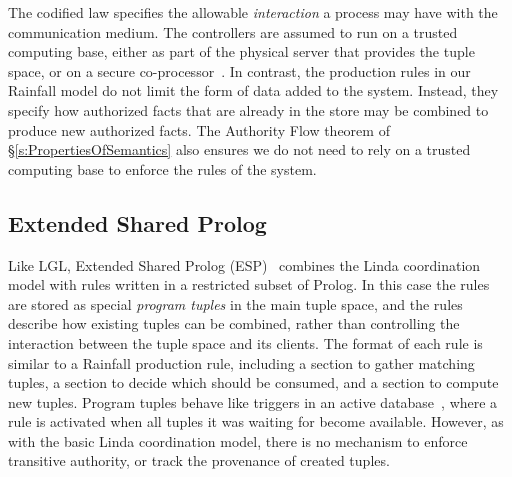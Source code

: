 The codified law specifies the allowable \emph{interaction} a process may have with the communication medium. The controllers are assumed to run on a trusted computing base, either as part of the physical server that provides the tuple space, or on a secure co-processor~\cite{Minsky2001:SafeTupleSpace}. In contrast, the production rules in our Rainfall model do not limit the form of data added to the system. Instead, they specify how authorized facts that are already in the store may be combined to produce new authorized facts. The Authority Flow theorem of \S\ref{s:PropertiesOfSemantics} also ensures we do not need to rely on a trusted computing base to enforce the rules of the system.


\subsection{Extended Shared Prolog}
\label{s:RelatedESP}
Like LGL, Extended Shared Prolog (ESP)~\cite{Ciancarini1993:Coordinating, Ciancarini1994:LogicTupleSpaces} combines the Linda coordination model with rules written in a restricted subset of Prolog. In this case the rules are stored as special \emph{program tuples} in the main tuple space, and the rules describe how existing tuples can be combined, rather than controlling the interaction between the tuple space and its clients. The format of each rule is similar to a Rainfall production rule, including a section to gather matching tuples, a section to decide which should be consumed, and a section to compute new tuples. Program tuples behave like triggers in an active database~\cite{Paton1999:Active}, where a rule is activated when all tuples it was waiting for become available. However, as with the basic Linda coordination model, there is no mechanism to enforce transitive authority, or track the provenance of created tuples.




